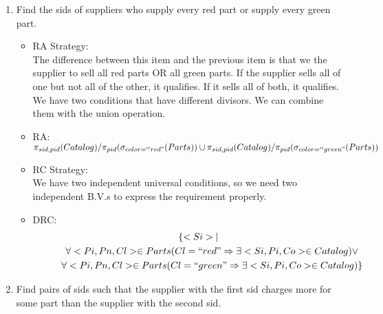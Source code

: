 \documentclass[12pt]{article}
\begin{document}
\begin{enumerate}
	\item Find the sids of suppliers who supply every red part or supply every green part. 

\begin{itemize}
\item RA Strategy: \\
The difference between this item and the previous item is that we the supplier to sell all red parts OR all green parts. If the supplier sells all of one but not all of the other, it qualifies. If it sells all of both, it qualifies. We have two conditions that have different divisors. We can combine them with the union operation.
\item RA: \\
$\pi_{sid,pid}(Catalog)/\pi_{pid}(\sigma_{color=''red"}(Parts)) \cup \pi_{sid,pid}(Catalog)/\pi_{pid}(\sigma_{color=''green"}(Parts))$
\item RC Strategy: \\
We have two independent universal conditions, so we need two independent B.V.s to express the requirement properly.
\item DRC:
\begin{multline*}
\{<Si>| \\ 
	\hspace{1cm}\forall <Pi,Pn,Cl> \in Parts(Cl  = ``red" \Rightarrow \exists <Si,Pi,Co> \in Catalog) \vee \\ 
	\hspace{1cm}\forall <Pi,Pn,Cl> \in Parts(Cl  = ``green" \Rightarrow \exists <Si,Pi,Co> \in Catalog)\} \\
\end{multline*}
\end{itemize}			
	
	\item Find pairs of sids such that the supplier with the first sid charges more for some part than the supplier with the second sid. 
	

\end{enumerate}
\end{document}

